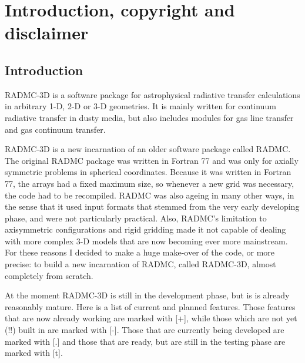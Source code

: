 \documentclass{report}
\begin{document}
\clearpage
\mbox{}
\vfill
{}



\clearpage

\setcounter{tocdepth}{3}

\tableofcontents

\clearpage


\chapter{Introduction, copyright and disclaimer}
\section{Introduction}
RADMC-3D is a software package for astrophysical radiative transfer
calculations in arbitrary 1-D, 2-D or 3-D geometries. It is mainly written
for continuum radiative transfer in dusty media, but also includes
modules for gas line transfer and gas continuum transfer.

RADMC-3D is a new incarnation of an older software package called RADMC.
The original RADMC package was written in Fortran 77 and was only for
axially symmetric problems in spherical coordinates. Because it was written
in Fortran 77, the arrays had a fixed maximum size, so whenever a new grid
was necessary, the code had to be recompiled. RADMC was also ageing in many
other ways, in the sense that it used input formats that stemmed from the
very early developing phase, and were not particularly practical. Also,
RADMC's limitation to axisymmetric configurations and rigid gridding made it
not capable of dealing with more complex 3-D models that are now becoming
ever more mainstream. For these reasons I decided to make a huge make-over
of the code, or more precise: to build a new incarnation of RADMC, called
RADMC-3D, almost completely from scratch. 

At the moment RADMC-3D is still in the development phase, but is is already
reasonably mature. Here is a list of current and planned features. Those
features that are now already working are marked with [+], while those which
are not yet (!!) built in are marked with [-]. Those that are currently
being developed are marked with [.] and those that are ready, but are still
in the testing phase are marked with [t].
\end{document}
